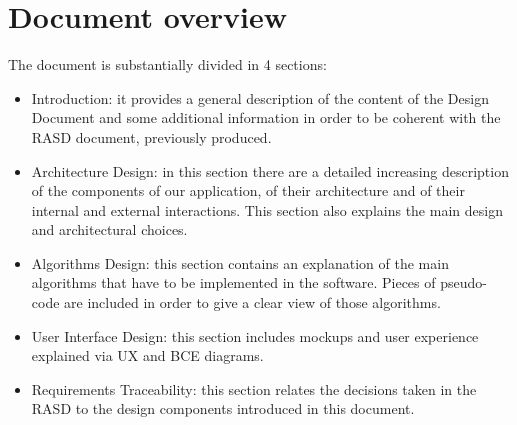 \section{Document overview}
The document is substantially divided in 4 sections:
\begin{itemize}
\item Introduction: it provides a general description of the content of the Design Document and some additional information in order to be coherent with the RASD document, previously produced.
\item Architecture Design: in this section there are a detailed increasing description of the components of our application, of their architecture and of their internal and external interactions.
This section also explains the main design and architectural choices.
\item Algorithms Design: this section contains an explanation of the main algorithms that have to be implemented in the software.
Pieces of pseudo-code are included in order to give a clear view of those algorithms.
\item User Interface Design: this section includes mockups and user experience explained via UX and BCE diagrams.
\item Requirements Traceability: this section relates the decisions taken in the RASD to the design components introduced in this document.
\end{itemize}
